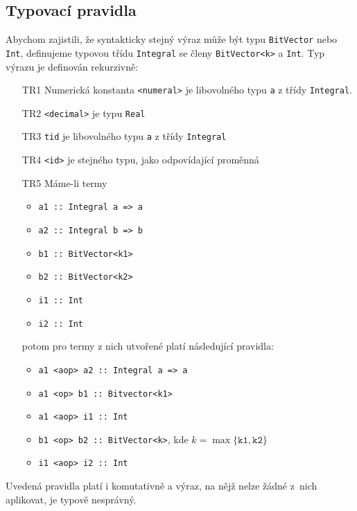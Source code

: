 \documentclass[12pt]{fithesis2}
\begin{document}
\subsection{Typovací pravidla}
Abychom zajistili, že syntakticky stejný výraz může být typu \texttt{BitVector} nebo \texttt{Int}, definujeme typovou třídu \texttt{Integral} se členy \texttt{BitVector<k>} a \texttt{Int}. Typ výrazu je definován rekurzivně:
\begin{enumerate}
\item[TR1] Numerická konstanta \texttt{<numeral>} je libovolného typu \texttt{a} z třídy \texttt{Integral}.
\item[TR2] \texttt{<decimal>} je typu \texttt{Real}
\item[TR3] \texttt{tid} je libovolného typu \texttt{a} z třídy \texttt{Integral}
\item[TR4] \texttt{<id>} je stejného typu, jako odpovídající proměnná
\item[TR5] Máme-li termy
	\begin{itemize}
	\item \texttt{a1 :: Integral a => a}
	\item \texttt{a2 :: Integral b => b}
	\item \texttt{b1 :: BitVector<k1>}
	\item \texttt{b2 :: BitVector<k2>}
	\item \texttt{i1 :: Int}
	\item \texttt{i2 :: Int}
	\end{itemize}
	potom pro termy z nich utvořené platí následující pravidla:
	\begin{itemize}
	\item \texttt{a1 <aop> a2 :: Integral a => a}
	\item \texttt{a1 <op>  b1 :: Bitvector<k1>}
	\item \texttt{a1 <aop> i1 :: Int}
	\item \texttt{b1 <op>  b2 :: BitVector<k>}, kde $k = \max\{\texttt{k1}, \texttt{k2}\} $
	\item \texttt{i1 <aop> i2 :: Int}
	\end{itemize}
\end{enumerate}
Uvedená pravidla platí i komutativně a výraz, na nějž nelze žádné z~nich aplikovat, je typově nesprávný.

\end{document}

